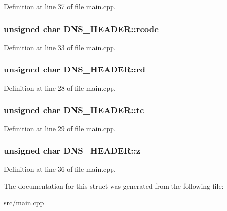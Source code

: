 Definition at line 37 of file main.\-cpp.

\hypertarget{struct_d_n_s___h_e_a_d_e_r_a3b7ff1e78cc57527d2afe217fd4d0178}{
\subsubsection[{rcode}]{\setlength{\rightskip}{0pt plus 5cm}unsigned char D\-N\-S\-\_\-\-H\-E\-A\-D\-E\-R\-::rcode}}\label{struct_d_n_s___h_e_a_d_e_r_a3b7ff1e78cc57527d2afe217fd4d0178}


Definition at line 33 of file main.\-cpp.

\hypertarget{struct_d_n_s___h_e_a_d_e_r_ae36057dbcab8fd192148aed912270462}{
\subsubsection[{rd}]{\setlength{\rightskip}{0pt plus 5cm}unsigned char D\-N\-S\-\_\-\-H\-E\-A\-D\-E\-R\-::rd}}\label{struct_d_n_s___h_e_a_d_e_r_ae36057dbcab8fd192148aed912270462}


Definition at line 28 of file main.\-cpp.

\hypertarget{struct_d_n_s___h_e_a_d_e_r_acfd94249b1b03793d63a6b87fea41d9e}{
\subsubsection[{tc}]{\setlength{\rightskip}{0pt plus 5cm}unsigned char D\-N\-S\-\_\-\-H\-E\-A\-D\-E\-R\-::tc}}\label{struct_d_n_s___h_e_a_d_e_r_acfd94249b1b03793d63a6b87fea41d9e}


Definition at line 29 of file main.\-cpp.

\hypertarget{struct_d_n_s___h_e_a_d_e_r_a4a09d9fe1ea80fcc992af0e4a90b0e6c}{
\subsubsection[{z}]{\setlength{\rightskip}{0pt plus 5cm}unsigned char D\-N\-S\-\_\-\-H\-E\-A\-D\-E\-R\-::z}}\label{struct_d_n_s___h_e_a_d_e_r_a4a09d9fe1ea80fcc992af0e4a90b0e6c}


Definition at line 36 of file main.\-cpp.



The documentation for this struct was generated from the following file\-:\begin{DoxyCompactItemize}
\item 
src/\hyperlink{main_8cpp}{main.\-cpp}\end{DoxyCompactItemize}
